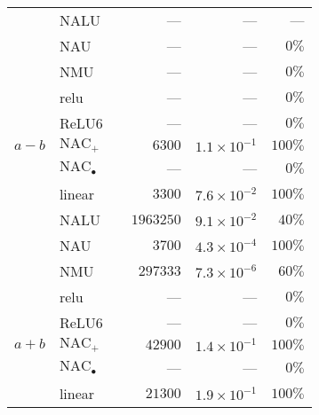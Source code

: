 \begin{table}[H]
\begin{tabular}{lll |rrr}
                       & NALU                       &     & ---                   &      ---              & ---                   \\ 
                       & NAU                        &     & ---                   &     ---               & $0\%$                \\ 
                       & NMU                        &     & ---                   &     ---               & $0\%$                \\ 
                       & relu                       &     & ---                   &     ---               & $0\%$                \\ 
                       & ReLU6                      &     & ---                   &     ---               & $0\%$                \\ 
  $a - b$              & ${\mathrm{NAC}_{+}}$      &     & $6300$                & $1.1 \times 10^{-1}$ & $100\%$              \\ 
                       & ${\mathrm{NAC}_\bullet}$ &     & ---                   &     ---               & $0\%$                \\ 
                       & linear                     &     & $3300$                & $7.6 \times 10^{-2}$ & $100\%$              \\ 
                       & NALU                       &     & $1963250$             & $9.1 \times 10^{-2}$ & $40\%$               \\ 
                       & NAU                        &     & $3700$                & $4.3 \times 10^{-4}$ & $100\%$              \\ 
                       & NMU                        &     & $297333$              & $7.3 \times 10^{-6}$ & $60\%$               \\ 
                       & relu                       &     & ---                   &     ---               & $0\%$                \\ 
                       & ReLU6                      &     & ---                   &     ---               & $0\%$                \\ 
  $a + b$              & ${\mathrm{NAC}_{+}}$      &     & $42900$               & $1.4 \times 10^{-1}$ & $100\%$              \\ 
                       & ${\mathrm{NAC}_\bullet}$ &     & ---                   &     ---               & $0\%$                \\ 
                       & linear                     &     & $21300$               & $1.9 \times 10^{-1}$ & $100\%$              \\ 

\end{tabular}
\end{table}
